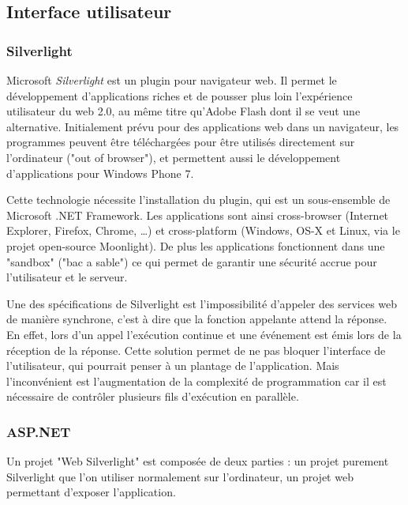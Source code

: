 \subsection{Interface utilisateur}


\subsubsection{Silverlight}

Microsoft \textit{Silverlight} est un plugin pour navigateur web. Il permet le développement d'applications riches et de pousser plus loin l'expérience utilisateur du web 2.0, au même titre qu'Adobe Flash dont il se veut une alternative. Initialement prévu pour des applications web dans un navigateur, les programmes peuvent être téléchargées pour être utilisés directement sur l'ordinateur ("out of browser"), et permettent aussi le développement d'applications pour Windows Phone 7.

Cette technologie nécessite l'installation du plugin, qui est un sous-ensemble de Microsoft .NET Framework. Les applications sont ainsi cross-browser (Internet Explorer, Firefox, Chrome, \ldots) et cross-platform (Windows, OS-X et Linux, via le projet open-source Moonlight). De plus les applications fonctionnent dans une "sandbox" ("bac a sable") ce qui permet de garantir une sécurité accrue pour l'utilisateur et le serveur.

Une des spécifications de Silverlight est l'impossibilité d'appeler des services web de manière synchrone, c'est à dire que la fonction appelante attend la réponse. En effet, lors d'un appel l'exécution continue et une événement est émis lors de la réception de la réponse. Cette solution permet de ne pas bloquer l'interface de l'utilisateur, qui pourrait penser à un plantage de l'application. Mais l'inconvénient est l'augmentation de la complexité de programmation car il est nécessaire de contrôler plusieurs fils d'exécution en parallèle.

\subsubsection{ASP.NET}

Un projet "Web Silverlight" est composée de deux parties : un projet purement Silverlight que l'on utiliser normalement sur l'ordinateur, un projet web permettant d'exposer l'application.

